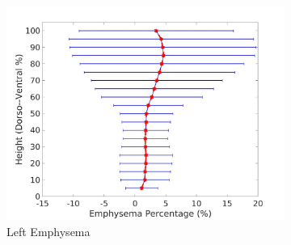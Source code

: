 \begin{figure}[H]
\begin{subfigure}{.42\linewidth}
  \includegraphics[width=\linewidth,trim={{.0\wd0} {.0\wd0} {.0\wd0} {.0\wd0}},clip]{QuantitativeAnalysis/Image/LeftLungEmphysemaDiseaseDorsoToVentral.jpg} %
  \caption{Left Emphysema}
  \label{fig:DiseaseDorsoToVentral-g} 
\end{subfigure} 
\begin{subfigure}{.42\linewidth}%

\end{subfigure}
\end{figure}
